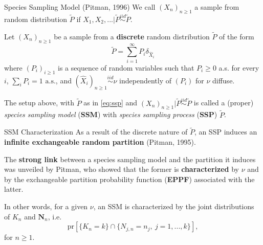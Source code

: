 \documentclass[11pt]{beamer}
\begin{document}
\begin{frame}{Species Sampling Model (Pitman, 1996)}
    We call \((X_n)_{n \geq 1}\) a sample from random distribution \(\tilde{P}\) if \(X_1,X_2,... | \tilde{P} \overset{iid}{\sim} \tilde{P}\).
    \begin{definition}
        \label{th:ssm}
        Let \((X_n)_{n \geq 1}\) be a sample from a \textbf{discrete} random distribution \(\tilde{P}\) of the form
        \begin{equation}
            \label{eq:ssp}
            \tilde{P} = \sum_{i = 1}^{\infty} P_{i} \delta_{\hat{X}_i}
        \end{equation}
        where \((P_i)_{i \geq 1}\) is a sequence of random variables such that \(P_i \geq 0\) a.s. for every \(i\), \(\sum_i P_i = 1 \text{ a.s.}\), and \((\hat{X}_i)_{n \geq 1} \overset{iid}{\sim} \nu\) independently of \((P_i)\) for \(\nu\) diffuse.
        \medskip
        
        The setup above, with \(\tilde{P}\) as in \eqref{eq:ssp} and \((X_n)_{n \geq 1} | \tilde{P} \overset{iid}{\sim} \tilde{P}\) is called a (proper) \textit{species sampling model} (\textbf{SSM}) with \textit{species sampling process} (\textbf{SSP}) \(\tilde{P}\).
    \end{definition}
\end{frame}

\begin{frame}{SSM Characterization}
    As a result of the discrete nature of \(\tilde{P}\), an SSP induces an \textbf{infinite exchangeable random partition} (Pitman, 1995).
    \medskip\pause
    
    The \textbf{strong link} between a species sampling model and the partition it induces was unveiled by Pitman, who showed that the former is \textbf{characterized} by \(\nu\) and by the exchangeable partition probability function (\textbf{EPPF}) associated with the latter. 
    \medskip
    
    In other words, for a given \(\nu\), an SSM is characterized by the joint distributions of \(K_n\) and \(\mathbf{N}_n\), i.e.
    \begin{equation*}
        \text{pr}[\{K_n = k\} \cap \{N_{j,n} = n_j,\ j = 1,...,k\}],
    \end{equation*}
    for \(n \geq 1\).
\end{frame}
\end{document}
